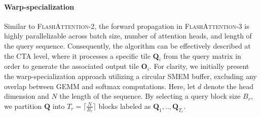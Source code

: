 \paragraph{Warp-specialization}
Similar to \textsc{FlashAttention-2}, the forward propagation in \textsc{FlashAttention-3} is highly parallelizable across batch size, number of attention heads, and length of the query sequence. Consequently, the algorithm can be effectively described at the CTA level, where it processes a specific tile $\mathbf{Q}_i$ from the query matrix in order to generate the associated output tile $\mathbf{O}_i$. For clarity, we initially present the warp-specialization approach utilizing a circular SMEM buffer, excluding any overlap between GEMM and softmax computations. Here, let $d$ denote the head dimension and $N$ the length of the sequence. By selecting a query block size $B_r$, we partition $\mathbf{Q}$ into $T_r = \lceil \frac{N}{B_r} \rceil$ blocks labeled as $\mathbf{Q}_1, .., \mathbf{Q}_{T_r}$.

